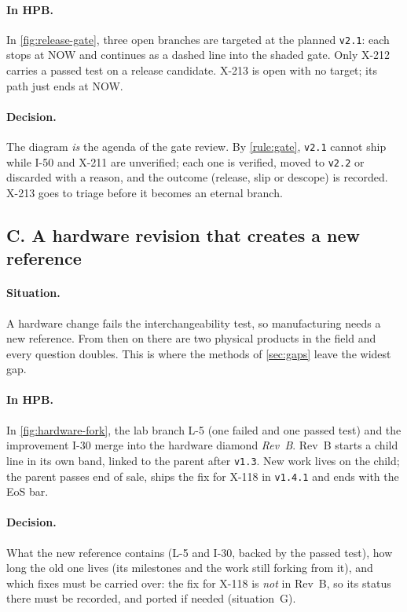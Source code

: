 \paragraph{In HPB.}
In \cref{fig:release-gate}, three open branches are targeted at the
planned \texttt{v2.1}: each stops at NOW and continues as a dashed line
into the shaded gate. Only X-212 carries a passed test on a release
candidate. X-213 is open with no target; its path just ends at NOW.

\paragraph{Decision.}
The diagram \emph{is} the agenda of the gate review. By \cref{rule:gate},
\texttt{v2.1} cannot ship while I-50 and X-211 are unverified; each one is
verified, moved to \texttt{v2.2} or discarded with a reason, and the
outcome (release, slip or descope) is recorded. X-213 goes to triage
before it becomes an eternal branch.

\subsection{C. A hardware revision that creates a new reference}
\label{sec:cond-hardware}



\paragraph{Situation.}
A hardware change fails the interchangeability test, so manufacturing
needs a new reference. From then on there are two physical products in
the field and every question doubles. This is where the methods of
\cref{sec:gaps} leave the widest gap.

\paragraph{In HPB.}
In \cref{fig:hardware-fork}, the lab branch L-5 (one failed and one passed
test) and the improvement I-30 merge into the hardware diamond
\emph{Rev~B}. Rev~B starts a child line in its own band, linked to the
parent after \texttt{v1.3}. New work lives on the child; the parent passes
end of sale, ships the fix for X-118 in \texttt{v1.4.1} and ends with the
\textsf{EoS} bar.

\paragraph{Decision.}
What the new reference contains (L-5 and I-30, backed by the passed test),
how long the old one lives (its milestones and the work still forking
from it), and which fixes must be carried over: the fix for X-118 is
\emph{not} in Rev~B, so its status there must be recorded, and ported if
needed (situation~G).


